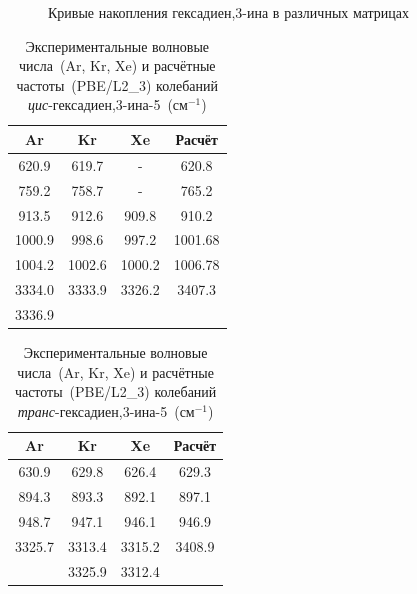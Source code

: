 { \begin{figure}[H]
\caption{Кривые накопления гексадиен,3\nobreakdash-ина в различных матрицах}
\label{135r}
\end{figure}

\begin{table}[H]
\caption{Экспериментальные волновые числа~(Ar, Kr, Xe) и расчётные частоты~(PBE/L2\_3) колебаний {\it цис}-гексадиен,3-ина-5~(см$^{-1}$)}
\label{135}
\begin{center}
\begin{tabular}{cccc}
Ar & Kr & Xe & Расчёт \\
\hline
620.9 & 619.7 & - & 620.8\\
759.2 & 758.7 & - & 765.2\\
913.5 & 912.6 & 909.8 & 910.2\\
1000.9 & 998.6 & 997.2 & 1001.68\\
1004.2 & 1002.6 & 1000.2 & 1006.78\\
3334.0 & 3333.9 & 3326.2 & 3407.3\\
3336.9 &  & \\
\end{tabular}
\end{center}
\end{table}

\begin{table}[H]
\caption{Экспериментальные волновые числа~(Ar, Kr, Xe) и расчётные частоты~(PBE/L2\_3) колебаний {\it транс}-гексадиен,3-ина-5~(см$^{-1}$)}
\label{1351}
\begin{center}
\begin{tabular}{cccc}
Ar & Kr & Xe & Расчёт \\
\hline
630.9 & 629.8 & 626.4 & 629.3\\
894.3 & 893.3 & 892.1 & 897.1\\
948.7 & 947.1 & 946.1 & 946.9\\
3325.7 & 3313.4 & 3315.2 & 3408.9\\
 & 3325.9 & 3312.4 & \\
\end{tabular}
\end{center}
\end{table}

}
